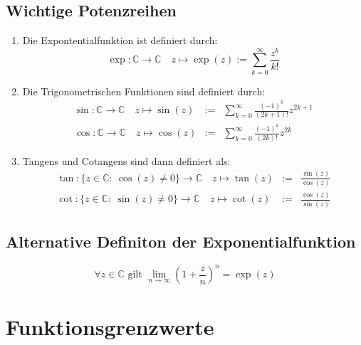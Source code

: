 \documentclass[10pt]{article}
\newcommand{\C}{\mathbb{C}}
\begin{document}
    \subsection{Wichtige Potenzreihen}
    \begin{enumerate}[label= (\alph*)]
        \item Die Expontentialfunktion ist definiert durch:
            \begin{equation*}
                \exp: \C \rightarrow \C\quad z \mapsto \exp(z) :=
                \sum_{k=0}^\infty \frac{z^k}{k!}
            \end{equation*}
        \item Die Trigonometrischen Funktionen sind definiert durch:
            \begin{eqnarray*}
                \sin: \C \rightarrow \C\quad z \mapsto \sin(z) &:=&
                \sum_{k=0}^\infty \frac{{(-1)}^k}{(2k+1)!}z^{2k+1}\\
                \cos: \C \rightarrow \C\quad z \mapsto \cos(z) &:=&
                \sum_{k=0}^\infty \frac{{(-1)}^k}{(2k)!}z^{2k}
            \end{eqnarray*}
        \item Tangens und Cotangens sind dann definiert als:
            \begin{eqnarray*}
                \tan: \{z \in \C:\ \cos(z) \neq 0 \} \rightarrow \C\quad
                z \mapsto \tan(z)&:=&\frac{\sin(z)}{\cos(z)}\\
                \cot: \{z \in \C:\ \sin(z) \neq 0 \} \rightarrow \C\quad
                z \mapsto \cot(z)&:=&\frac{\cos(z)}{\sin(z)}
            \end{eqnarray*}
    \end{enumerate}

    \subsection{Alternative Definiton der Exponentialfunktion}
    \begin{equation*}
        \forall z \in \C \text{ gilt }
        \lim_{n \rightarrow \infty} {\left(1 + \frac{z}{n}\right)}^n = \exp{(z)}
    \end{equation*}

    \section{Funktionsgrenzwerte}
\end{document}
